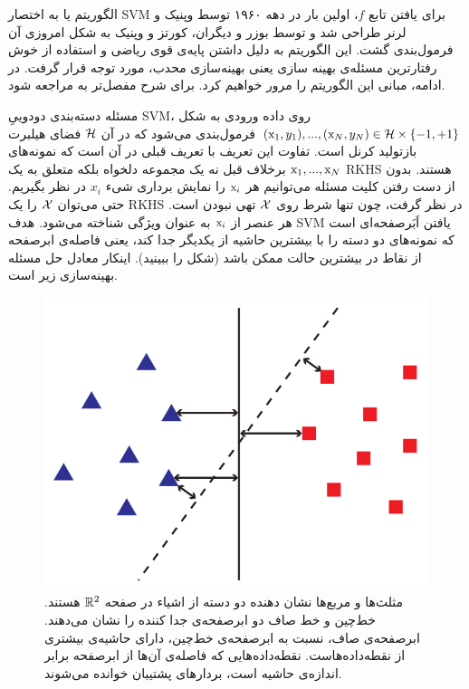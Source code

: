 الگوریتم  یا به اختصار SVM برای یافتن تابع $f$، اولین بار در دهه ۱۹۶۰ توسط وپنیک و لرنر طراحی شد و توسط بوزر و دیگران، کورتز و وپنیک به شکل امروزی آن فرمول‌بندی گشت. این الگوریتم به دلیل داشتن پایه‌ی قوی ریاضی و استفاده از خوش رفتارترین مسئله‌ی بهینه سازی‌ یعنی بهینه‌سازی‌ محدب، مورد توجه قرار گرفت. در ادامه، مبانی این الگوریتم را مرور خواهیم کرد. برای شرح مفصل‌تر به  مراجعه شود.

مسئله دسته‌بندی دودوییِ SVM، روی داده ورودی به شکل 
$(\mathrm{x}_1,y_1),...,(\mathrm{x}_N,y_N) \in \mathcal{H}\times\left\lbrace -1,+1 \right\rbrace$
 فرمول‌بندی می‌شود که در آن $\mathcal{H}$ فضای هیلبرت بازتولید کرنل است. تفاوت این تعریف با تعریف قبلی در آن است که نمونه‌های $\mathrm{x}_1,...,\mathrm{x}_N$ برخلاف قبل نه یک مجموعه دلخواه بلکه متعلق به یک RKHS هستند. بدون از دست رفتن کلیت مسئله می‌توانیم هر $\mathrm{x}_i$ را نمایش برداری شیء $x_i$ در نظر بگیریم. حتی می‌توان $\mathcal{X}$ را یک RKHS در نظر گرفت، چون تنها شرط روی $\mathcal{X}$ تهی نبودن است. هر عنصر از $\mathrm{x}_i$ به عنوان ویژگی شناخته می‌شود. هدف SVM یافتن اَبَرصفحه‌ای است که نمونه‌های دو دسته را با بیشترین حاشیه از یکدیگر جدا کند، یعنی فاصله‌ی ابرصفحه از نقاط در بیشترین حالت ممکن باشد (شکل  را ببینید). اینکار معادل حل مسئله بهینه‌سازی زیر است.
 
\begin{figure}[ht]
\centering
\includegraphics[scale=0.3]{./svm-margin.png}
\caption{مثلث‌ها و مربع‌ها نشان دهنده دو دسته از اشیاء در صفحه $\mathbb{R}^2$ هستند. خط‌چین و خط صاف دو ابرصفحه‌ی جدا کننده را نشان می‌دهند. ابرصفحه‌ی ‌صاف، نسبت به ابرصفحه‌ی ‌خط‌چین، دارای حاشیه‌ی ‌بیشتری از نقطه‌داده‌هاست. نقطه‌داده‌هایی که فاصله‌ی آن‌ها از ابرصفحه برابر انداز‌ه‌ی حاشیه است، بردارهای پشتیبان خوانده می‌شوند.}
\label{fig:svm-margin}
\end{figure} 
 
